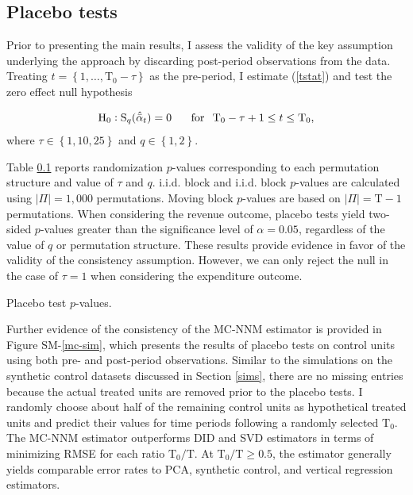 \documentclass[hidelinks,12pt]{article}
\begin{document}
\subsection{Placebo tests} \label{placebo-tests}

Prior to presenting the main results, I assess the validity of the key assumption underlying the approach by discarding post-period observations from the data. Treating $t = \left\{1, \ldots,  \text{T}_0 - \tau\right\}$ as the pre-period, I estimate (\ref{tstat}) and test the zero effect null hypothesis 

\begin{equation} \label{h0-placebo}
\text{H}_0: \text{S}_q (\hat{\bar{\alpha}}_{t}) = 0  \, \hspace{5mm} \,  \text{for} \, \hspace{2mm}  \text{T}_0 - \tau +1 \leq t \leq  \text{T}_0,
\end{equation}
\noindent
where $\tau \in \left\{1, 10, 25\right\}$ and $q \in \left\{1, 2\right\}$. 

Table \ref{placebo-tests} reports randomization $p$-values corresponding to each permutation structure and value of $\tau$ and $q$. i.i.d. block and i.i.d. block $p$-values are calculated using $|\Pi| = 1,000$ permutations. Moving block $p$-values are based on $|\Pi| = \text{T}-1$ permutations. When considering the revenue outcome, placebo tests yield two-sided $p$-values greater than the significance level of $\alpha = 0.05$, regardless of the value of $q$ or permutation structure. These results provide evidence in favor of the validity of the consistency assumption. However, we can only reject the null in the case of $\tau=1$ when considering the expenditure outcome. 

\begin{table}[htbp]
	\captionsetup{font=normalsize}
	\caption{Placebo test $p$-values.\label{placebo-tests}}
	\begin{center}
		\scalebox{.95}{}
	\end{center}
\end{table}

Further evidence of the consistency of the MC-NNM estimator is provided in Figure SM-\ref{mc-sim}, which presents the results of placebo tests on control units using both pre- and post-period observations. Similar to the simulations on the synthetic control datasets discussed in Section \ref{sims}, there are no missing entries because the actual treated units are removed prior to the placebo tests. I randomly choose about half of the remaining control units as hypothetical treated units and predict their values for time periods following a randomly selected $\text{T}_0$. The MC-NNM estimator outperforms DID and SVD estimators in terms of minimizing RMSE for each ratio $\text{T}_0/\text{T}$. At $\text{T}_0/\text{T} \geq 0.5$, the estimator generally yields comparable error rates to PCA, synthetic control, and vertical regression estimators. 
\end{document}

